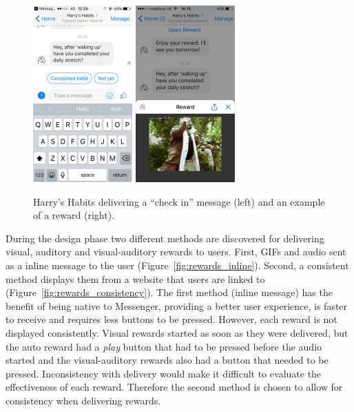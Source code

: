 \begin{figure}[H]
  \centering
  \includegraphics[width=1.5in]{resources/figures/reminder.png}
  \hspace{10px}
  \includegraphics[width=1.5in]{resources/figures/reward-visual.png}
  \caption{Harry's Habits delivering a ``check in'' message (left) and an example of a reward (right).}
  \label{fig:delivering_reward}
\end{figure}


During the design phase two different methods are discovered for delivering visual, auditory and visual-auditory rewards to users. First, GIFs and audio sent as a inline message to the user (Figure~\ref{fig:rewards_inline}). Second, a consistent method displays them from a website that users are linked to (Figure~\ref{fig:rewards_consistency}). The first method (inline message) has the benefit of being native to Messenger, providing a better user experience, is faster to receive and requires less buttons to be pressed. However, each reward is not displayed consistently. Visual rewards started as soon as they were delivered, but the auto reward had a \textit{play} button that had to be pressed before the audio started and the visual-auditory rewards also had a button that needed to be pressed. Inconsistency with delivery would make it difficult to evaluate the effectiveness of each reward. Therefore the second method is chosen to allow for consistency when delivering rewards.

